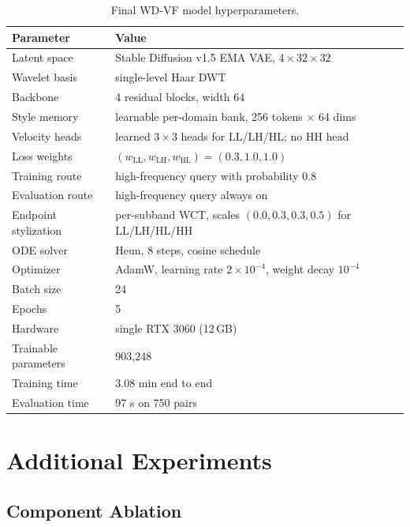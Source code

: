 \documentclass[10pt,letterpaper]{article}
\begin{document}
\begin{table}[h]
\centering
\caption{Final WD-VF model hyperparameters.}
\label{tab:hyper}
\small
\begin{tabular}{@{}ll@{}}
\toprule
Parameter & Value \\
\midrule
Latent space & Stable Diffusion v1.5 EMA VAE, $4 \times 32 \times 32$ \\
Wavelet basis & single-level Haar DWT \\
Backbone & 4 residual blocks, width $64$ \\
Style memory & learnable per-domain bank, 256 tokens $\times$ 64 dims \\
Velocity heads & learned $3\times3$ heads for LL/LH/HL; no HH head \\
Loss weights & $(w_{\mathrm{LL}},w_{\mathrm{LH}},w_{\mathrm{HL}})=(0.3,1.0,1.0)$ \\
Training route & high-frequency query with probability $0.8$ \\
Evaluation route & high-frequency query always on \\
Endpoint stylization & per-subband WCT, scales $(0.0,0.3,0.3,0.5)$ for LL/LH/HL/HH \\
ODE solver & Heun, 8 steps, cosine schedule \\
Optimizer & AdamW, learning rate $2\times10^{-4}$, weight decay $10^{-4}$ \\
Batch size & 24 \\
Epochs & 5 \\
Hardware & single RTX 3060 (12\,GB) \\
Trainable parameters & 903{,}248 \\
Training time & 3.08 min end to end \\
Evaluation time & 97 s on 750 pairs \\
\bottomrule
\end{tabular}
\end{table}

\section{Additional Experiments}
\label{sec:additional_exp}

\subsection{Component Ablation}
\label{sec:ablation}
\end{document}
